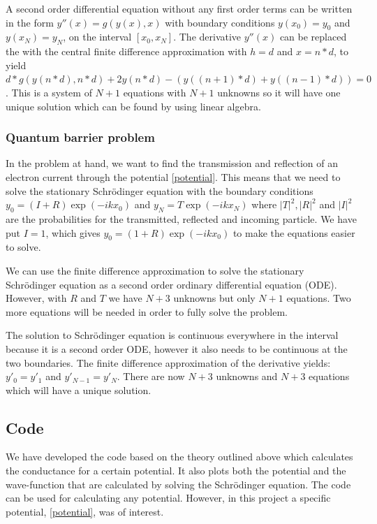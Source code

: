 \documentclass[a4paper]{article}
\begin{document}
A second order differential equation without any first order terms can be written in the form $y''(x) = g(y(x),x)$ with boundary conditions $y(x_{0}) = y_{0}$ and $y(x_{N}) = y_{N}$, on the interval $[x_{0},x_{N}]$. The derivative $y''(x)$ can be replaced the with the central finite difference approximation with $h = d$ and $x = n*d$, to yield $d*g(y(n*d),n*d) + 2y(n*d)-(y((n+1)*d)+y((n-1)*d)) = 0$. This is a system of $N+1$ equations with $N+1$ unknowns so it will have one unique solution which can be found by using linear algebra.

\subsubsection{Quantum barrier problem}

In the problem at hand, we want to find the transmission and reflection of an electron current through the potential \eqref{potential}. This means that we need to solve the stationary Schr\"odinger equation with the boundary conditions $y_{0} = (I + R)\exp{(-i k x_{0})}$ and $y_{N} = T\exp{(-i k x_{N})}$ where $|T|^2,|R|^2$ and $|I|^2$ are the probabilities for the transmitted, reflected and incoming particle. We have put $I=1$, which gives $y_{0} = (1 + R)\exp{(-i k x_{0})}$ to make the equations easier to solve.

We can use the finite difference approximation to solve the stationary Schr\"odinger equation as a second order ordinary differential equation (ODE). However, with $R$ and $T$ we have $N+3$ unknowns but only $N+1$ equations. Two more equations will be needed in order to fully solve the problem.

The solution to Schr\"odinger equation is continuous everywhere in the interval because it is a second order ODE, however it also needs to be continuous at the two boundaries. The finite difference approximation of the derivative yields: $y'_{0}=y'_{1}$ and $y'_{N-1}=y'_{N}$. There are now $N+3$ unknowns and $N+3$ equations which will have a unique solution.


\subsection{Code}
We have developed the code based on the theory outlined above which calculates the conductance for a certain potential. It also plots both the potential and the wave-function that are calculated by solving the Schr\"odinger equation.
The code can be used for calculating any potential. However, in this project a specific potential, \eqref{potential}, was of interest.
\end{document}
